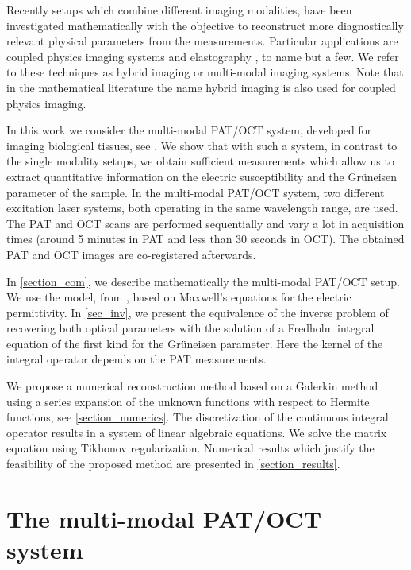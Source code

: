 \documentclass[a4paper,twoside,10pt]{article}
\theoremstyle{break}
\theoremstyle{nonumberplain}
\begin{document}
Recently setups which combine different imaging modalities, have been investigated mathematically with the objective to reconstruct more diagnostically relevant physical parameters from the measurements. 
Particular applications are coupled physics imaging systems 
and elastography \cite{Bal12, Kuc12, WidSch12}, to name but a few. 
We refer to these techniques as hybrid imaging or multi-modal imaging systems. Note that in the mathematical literature 
the name hybrid imaging is also used for coupled physics imaging.

In this work we consider the multi-modal PAT/OCT system, developed for imaging biological tissues, see  \cite{DreLiuKumKam14, LiuCheZab16, LiuSchmSanZab14, LiuSchmSanZab13, ZhaPovLauAleHof11}. 
We show that with such a system, in contrast to the single modality setups, we obtain sufficient measurements which allow us to extract quantitative information on the electric susceptibility and the Grüneisen parameter of the sample. 
In the multi-modal PAT/OCT system, two different excitation laser systems, both operating in the same wavelength range, are used. 
The PAT and OCT scans are performed sequentially and vary a lot in acquisition times (around 5 minutes in PAT and less than 30 seconds in 
OCT). The obtained PAT and OCT images are co-registered afterwards. 

In \autoref{section_com}, we describe mathematically the multi-modal PAT/OCT setup. We use the model, from \cite{ElbMinSch17},  based on Maxwell's equations for the electric permittivity. 
In \autoref{sec_inv}, we present the equivalence of the inverse problem of recovering both optical parameters with the 
solution of a Fredholm integral equation of the first kind for the Gr\"uneisen parameter. Here the kernel of the 
integral operator depends on the PAT measurements.

We propose a numerical reconstruction method based on a Galerkin method using a series expansion of the unknown 
functions with respect to Hermite functions, see \autoref{section_numerics}. The discretization of the continuous 
integral operator results in a system of linear algebraic equations.
We solve the matrix equation using Tikhonov regularization.  
Numerical results which justify the feasibility of the proposed method are presented in \autoref{section_results}.



\section{The multi-modal PAT/OCT system}\label{section_com}
\end{document}
